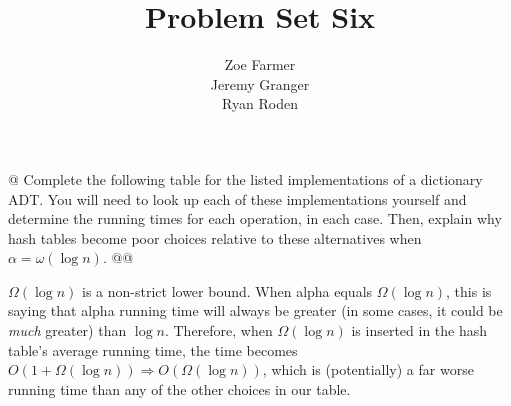 \documentclass[10pt]{article}
\title{Problem Set Six}
\author{Zoe Farmer\\Jeremy Granger\\Ryan Roden}
\begin{document}
\maketitle

\begin{easylist}[enumerate]
    @ Complete the following table for the listed implementations of a dictionary ADT. You will need to look up each of
    these implementations yourself and determine the running times for each operation, in each case. Then, explain why
    hash tables become poor choices relative to these alternatives when $\alpha = \omega(\log n)$.
    @@

    \begin{table}[!ht]
        \centering
    \end{table}

    $\Omega(\log n)$ is a non-strict lower bound.  When alpha equals $\Omega(\log n)$, this is saying that alpha
    running time will always be greater (in some cases, it could be \textit{much} greater) than $\log n$.  Therefore,
    when $\Omega(\log n)$ is inserted in the hash table's average running time, the time becomes $O(1 + \Omega(\log n))
    \Rightarrow O(\Omega(\log n))$, which is (potentially) a far worse running time than any of the other choices in our
    table.


\end{easylist}
\end{document}
